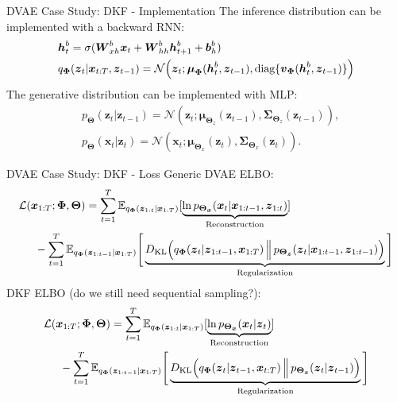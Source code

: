 \documentclass{beamer}
\newcommand{\bs}[1]{\boldsymbol{#1}}
\begin{document}
\begin{frame}{DVAE Case Study: DKF - Implementation}
The inference distribution can be implemented with a backward RNN:
\begin{align}
 & {\color{black}\bs{h}_{t}^{b}} = \sigma(\bs{W}_{xh}^{b} {\color{black}\bs{x}_{t}} + \bs{W}_{hh}^{b} {\color{black}\bs{h}_{t+1}^{b}} + \bs{b}_h^{b})\\
 & q_{\bs{\Phi}}({\color{black}\bs{z}_t} | {\color{black}\bs{x}_{t:T}}, {\color{black}\bs{z}_{t-1}} ) = \mathcal{N}\Big({\color{black}\bs{z}_t}; \boldsymbol{\mu}_{\bs{\Phi}}( {\color{black}\bs{h}_{t}^{b},\bs{z}_{t-1}} ), \text{diag}\{ \bs{v}_{\bs{\Phi}}( {\color{black}\bs{h}_{t}^{b}},\bs{z}_{t-1}) \} \Big)
\end{align}
The generative distribution can be implemented with MLP:
\begin{align}
  &p_{\bs{\Theta}}(\bs{z}_t|\bs{z}_{t-1}) = \mathcal{N}(\bs{z}_t; \bs{\mu}_{\bs{\Theta}_z}(\bs{z}_{t-1}), \bs{\Sigma}_{\bs{\Theta}_z}(\bs{z}_{t-1})),\\
  & p_{\bs{\Theta}}(\bs{x}_t|\bs{z}_{t}) = \mathcal{N}(\bs{x}_t; \bs{\mu}_{\bs{\Theta}_x}(\bs{z}_{t}), \bs{\Sigma}_{\bs{\Theta}_x}(\bs{z}_{t})).
\end{align}
\end{frame}

\begin{frame}{DVAE Case Study: DKF - Loss}
Generic DVAE ELBO:
\begin{align}
  & \mathcal{L}(\bs{x}_{1:T}; \bs{\Phi}, \bs{\Theta}) =
  \sum_{t=1}^T \mathbb{E}_{q_{\bs{\Phi}}(\bs{z}_{1:t} | \bs{x}_{1:T})} [\underbrace{\ln p_{\bs{\Theta}_{\bs{x}}}(\bs{x}_{t} | \bs{x}_{1:t-1}, \bs{z}_{1:t})}_{\text{Reconstruction}}]\\
  \nonumber& \hspace{5mm} - \sum_{t=1}^T \mathbb{E}_{q_{\bs{\Phi}}(\bs{z}_{1:t-1} | \bs{x}_{1:T})} \Bigg[ \underbrace{D_{\text{KL}}\Big(q_{\bs{\Phi}}(\bs{z}_{t} | \bs{z}_{1:t-1}, \bs{x}_{1:T}) \,\Big\lVert\, p_{\bs{\Theta}_{\bs{z}}}(\bs{z}_{t} | \bs{x}_{1:t-1},  \bs{z}_{1:t-1})\Big)}_{\text{Regularization}} \Bigg]  
\end{align}
DKF ELBO (do we still need sequential sampling?):
\begin{align}
  & \mathcal{L}(\bs{x}_{1:T}; \bs{\Phi}, \bs{\Theta}) =
  \sum_{t=1}^T \mathbb{E}_{q_{\bs{\Phi}}(\bs{z}_{1:t} | \bs{x}_{1:T})} [\underbrace{\ln p_{\bs{\Theta}_{\bs{x}}}(\bs{x}_{t} | \bs{z}_{t})}_{\text{Reconstruction}}]\\
  \nonumber& \hspace{5mm} - \sum_{t=1}^T \mathbb{E}_{q_{\bs{\Phi}}(\bs{z}_{1:t-1} | \bs{x}_{1:T})} \Bigg[ \underbrace{D_{\text{KL}}\Big(q_{\bs{\Phi}}(\bs{z}_{t} | \bs{z}_{t-1}, \bs{x}_{t:T}) \,\Big\lVert\, p_{\bs{\Theta}_{\bs{z}}}(\bs{z}_{t} | \bs{z}_{t-1})\Big)}_{\text{Regularization}} \Bigg]    
\end{align}
\end{frame}
\end{document}
